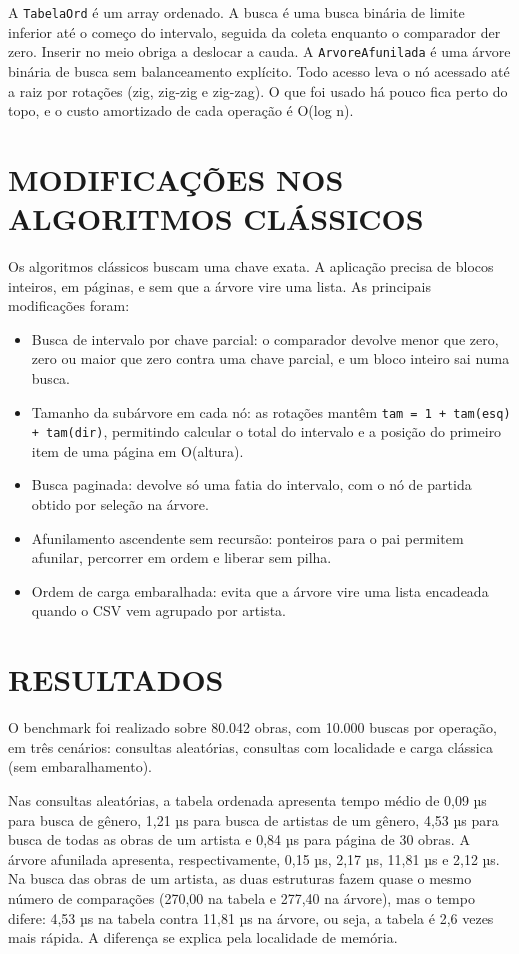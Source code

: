 \documentclass[12pt,a4paper,oneside]{article}
\begin{document}
A \texttt{TabelaOrd} é um array ordenado. A busca é uma busca binária de limite inferior até o começo do intervalo, seguida da coleta enquanto o comparador der zero. Inserir no meio obriga a deslocar a cauda. A \texttt{ArvoreAfunilada} é uma árvore binária de busca sem balanceamento explícito. Todo acesso leva o nó acessado até a raiz por rotações (zig, zig-zig e zig-zag). O que foi usado há pouco fica perto do topo, e o custo amortizado de cada operação é O(log n).

\section{\textbf{MODIFICAÇÕES NOS ALGORITMOS CLÁSSICOS}}

Os algoritmos clássicos buscam uma chave exata. A aplicação precisa de blocos inteiros, em páginas, e sem que a árvore vire uma lista. As principais modificações foram:

\begin{itemize}
    \item Busca de intervalo por chave parcial: o comparador devolve menor que zero, zero ou maior que zero contra uma chave parcial, e um bloco inteiro sai numa busca.
    \item Tamanho da subárvore em cada nó: as rotações mantêm \texttt{tam = 1 + tam(esq) + tam(dir)}, permitindo calcular o total do intervalo e a posição do primeiro item de uma página em O(altura).
    \item Busca paginada: devolve só uma fatia do intervalo, com o nó de partida obtido por seleção na árvore.
    \item Afunilamento ascendente sem recursão: ponteiros para o pai permitem afunilar, percorrer em ordem e liberar sem pilha.
    \item Ordem de carga embaralhada: evita que a árvore vire uma lista encadeada quando o CSV vem agrupado por artista.
\end{itemize}

\section{\textbf{RESULTADOS}}

O benchmark foi realizado sobre 80.042 obras, com 10.000 buscas por operação, em três cenários: consultas aleatórias, consultas com localidade e carga clássica (sem embaralhamento).

Nas consultas aleatórias, a tabela ordenada apresenta tempo médio de 0,09 µs para busca de gênero, 1,21 µs para busca de artistas de um gênero, 4,53 µs para busca de todas as obras de um artista e 0,84 µs para página de 30 obras. A árvore afunilada apresenta, respectivamente, 0,15 µs, 2,17 µs, 11,81 µs e 2,12 µs. Na busca das obras de um artista, as duas estruturas fazem quase o mesmo número de comparações (270,00 na tabela e 277,40 na árvore), mas o tempo difere: 4,53 µs na tabela contra 11,81 µs na árvore, ou seja, a tabela é 2,6 vezes mais rápida. A diferença se explica pela localidade de memória.
\end{document}
